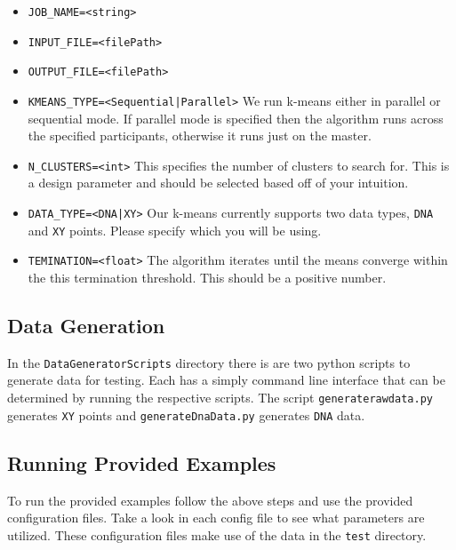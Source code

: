 \documentclass[12pt]{article}
\newcommand{\ttt}{\texttt}
\begin{document}
\begin{itemize}
\item
\ttt{JOB\_NAME=<string>}

\item
\ttt{INPUT\_FILE=<filePath>}

\item
\ttt{OUTPUT\_FILE=<filePath>}

\item
\ttt{KMEANS\_TYPE=<Sequential|Parallel>} We run k-means either in parallel or sequential mode. If parallel mode is specified then the algorithm runs across the specified participants, otherwise it runs just on the master.

\item
\ttt{N\_CLUSTERS=<int>} This specifies the number of clusters to search for. This is a design parameter and should be selected based off of your intuition.

\item
\ttt{DATA\_TYPE=<DNA|XY>} Our k-means currently supports two data types, \ttt{DNA} and \ttt{XY} points. Please specify which you will be using.

\item
\ttt{TEMINATION=<float>} The algorithm iterates until the means converge within the this termination threshold. This should be a positive number.

\end{itemize}

\subsection{Data Generation}
In the \ttt{DataGeneratorScripts} directory there is are two python scripts to generate data for testing. Each has a simply command line interface that can be determined by running the respective scripts. The script \ttt{generaterawdata.py} generates \ttt{XY} points and \ttt{generateDnaData.py} generates \ttt{DNA} data.

\subsection{Running Provided Examples}

To run the provided examples follow the above steps and use the provided configuration files. Take a look in each config file to see what parameters are utilized. These configuration files make use of the data in the \ttt{test} directory.

\end{document}
